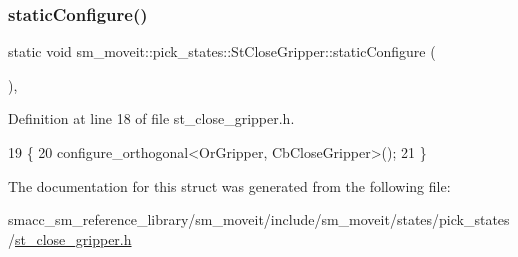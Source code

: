 \subsubsection{\texorpdfstring{static\+Configure()}{staticConfigure()}}
{\footnotesize\ttfamily static void sm\+\_\+moveit\+::pick\+\_\+states\+::\+St\+Close\+Gripper\+::static\+Configure (\begin{DoxyParamCaption}{ }\end{DoxyParamCaption})\hspace{0.3cm}{\ttfamily [inline]}, {\ttfamily [static]}}



Definition at line 18 of file st\+\_\+close\+\_\+gripper.\+h.


\begin{DoxyCode}
19    \{
20       configure\_orthogonal<OrGripper, CbCloseGripper>();
21    \}
\end{DoxyCode}


The documentation for this struct was generated from the following file\+:\begin{DoxyCompactItemize}
\item 
smacc\+\_\+sm\+\_\+reference\+\_\+library/sm\+\_\+moveit/include/sm\+\_\+moveit/states/pick\+\_\+states/\hyperlink{st__close__gripper_8h}{st\+\_\+close\+\_\+gripper.\+h}\end{DoxyCompactItemize}
